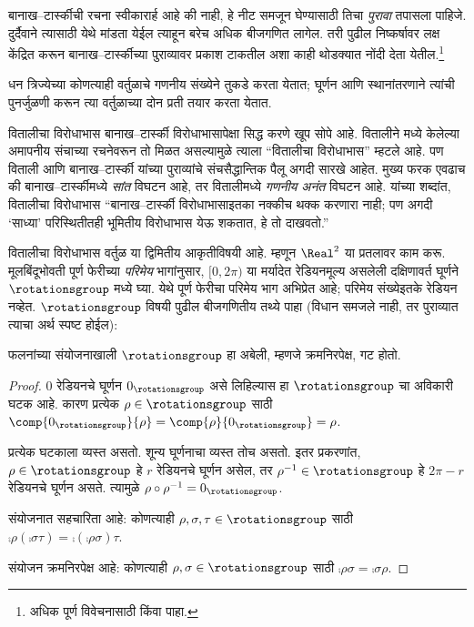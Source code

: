 \documentclass[../../../include/open-logic-section]{subfiles}
\begin{document}

बानाख--टार्स्कीची रचना स्वीकारार्ह आहे की नाही, हे नीट समजून घेण्यासाठी तिचा \emph{पुरावा} तपासला पाहिजे. दुर्दैवाने त्यासाठी येथे मांडता येईल त्याहून बरेच अधिक बीजगणित लागेल. तरी पुढील निष्कर्षावर लक्ष केंद्रित करून बानाख--टार्स्कीच्या पुराव्यावर प्रकाश टाकतील अशा काही थोडक्यात नोंदी देता येतील.\footnote{अधिक पूर्ण विवेचनासाठी \cite{Weston2003} किंवा \cite{Wagon2016} पाहा.}

\begin{thm}[वितालीचा विरोधाभास ($\ZFC$ मध्ये)]
धन त्रिज्येच्या कोणत्याही वर्तुळाचे गणनीय संख्येने तुकडे करता येतात; घूर्णन आणि स्थानांतरणाने त्यांची पुनर्जुळणी करून त्या वर्तुळाच्या दोन प्रती तयार करता येतात.
\end{thm}

वितालीचा विरोधाभास बानाख--टार्स्की विरोधाभासापेक्षा सिद्ध करणे खूप सोपे आहे. वितालीने \citeyear{Vitali1905} मध्ये केलेल्या अमापनीय संचाच्या रचनेवरून तो मिळत असल्यामुळे त्याला “वितालीचा विरोधाभास” म्हटले आहे. पण विताली आणि बानाख--टार्स्की यांच्या पुराव्यांचे संचसैद्धान्तिक पैलू अगदी सारखे आहेत. मुख्य फरक एवढाच की बानाख--टार्स्कीमध्ये \emph{सांत} विघटन आहे, तर वितालीमध्ये \emph{गणनीय अनंत} विघटन आहे. \citet{Weston2003} यांच्या शब्दांत, वितालीचा विरोधाभास “बानाख--टार्स्की विरोधाभासाइतका नक्कीच थक्क करणारा नाही; पण अगदी ‘साध्या’ परिस्थितीतही भूमितीय विरोधाभास येऊ शकतात, हे तो दाखवतो.”

वितालीचा विरोधाभास वर्तुळ या द्विमितीय आकृतीविषयी आहे. म्हणून $\Real^2$ या प्रतलावर काम करू. मूलबिंदूभोवती पूर्ण फेरीच्या \emph{परिमेय} भागांनुसार, $[0,2\pi)$ या मर्यादेत रेडियनमूल्य असलेली दक्षिणावर्त घूर्णने $\rotationsgroup$ मध्ये घ्या. येथे पूर्ण फेरीचा परिमेय भाग अभिप्रेत आहे; परिमेय संख्येइतके रेडियन नव्हेत. $\rotationsgroup$ विषयी पुढील बीजगणितीय तथ्ये पाहा (विधान समजले नाही, तर पुराव्यात त्याचा अर्थ स्पष्ट होईल):

\begin{lem}
फलनांच्या संयोजनाखाली $\rotationsgroup$ हा अबेली, म्हणजे क्रमनिरपेक्ष, {गट} होतो.
\end{lem}

\begin{proof}
$0$ रेडियनचे घूर्णन $0_{\rotationsgroup}$ असे लिहिल्यास हा $\rotationsgroup$ चा अविकारी घटक आहे. कारण प्रत्येक $\rho \in \rotationsgroup$ साठी $\comp{0_{\rotationsgroup}}{\rho} = \comp{\rho}{0_{\rotationsgroup}} =
\rho$.

प्रत्येक घटकाला व्यस्त असतो. शून्य घूर्णनाचा व्यस्त तोच असतो. इतर प्रकरणांत, $\rho \in \rotationsgroup$ हे $r$ रेडियनचे घूर्णन असेल, तर $\rho^{-1} \in \rotationsgroup$ हे $2\pi - r$ रेडियनचे घूर्णन असते. त्यामुळे $\rho \circ \rho^{-1} = 0_\rotationsgroup$.

संयोजनात सहचारिता आहे: कोणत्याही $\rho, \sigma, \tau \in
\rotationsgroup$ साठी $\comp{\rho}{(\comp{\sigma}{\tau})} =
\comp{(\comp{\rho}{\sigma})}{\tau}$.

संयोजन क्रमनिरपेक्ष आहे: कोणत्याही $\rho, \sigma \in \rotationsgroup$ साठी $\comp{\rho}{\sigma} =
\comp{\sigma}{\rho}$.
\end{proof}
\end{document}
